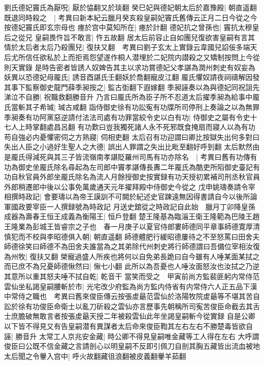 劉氏德妃竇氏為厭呪|{
	厭於恊翻又於琰翻}
癸巳妃與德妃朝太后於嘉豫殿|{
	朝直遥翻}
既退同時殺之　|{
	考異曰新本紀云臘月癸亥殺皇嗣妃竇氏舊傳云正月二日今從之今按德妃竇氏即玄宗母也}
瘞於宫中莫知所在|{
	瘞於計翻}
德妃抗之曾孫也|{
	竇抗太穆皇后之從兄}
皇嗣畏忤旨不敢言|{
	忤五故翻}
居太后前容止自如團兒復欲害皇嗣有言其情於太后者太后乃殺團兒|{
	復扶又翻　考異曰劉子玄太上實錄云韋國兒諂佞多端天后尤所信任欲私於上而拒焉怨望遂作桐人潜埋於二妃院内譛殺之又矯制按問上今從則天實錄}
是時告密者皆誘人奴婢告其主以求功賞德妃父孝諶為潤州刺史有奴妄為妖異以恐德妃母龎氏|{
	誘音酉諶氏壬翻妖於喬翻寵皮江翻}
龎氏懼奴請夜祠禱解因發其事下監察御史龍門薛季昶按之|{
	監古衘翻下遐嫁翻}
季昶誣奏以為與德妃同祝詛先涕泣不自勝|{
	祝職救翻勝音升}
乃言曰龎氏所為臣子所不忍道太后擢季昶為給事中龎氏當斬其子希瑊|{
	瑊古咸翻}
詣侍御史徐有功訟寃有功牒所司停刑上奏論之以為無罪季昶奏有功阿黨惡逆請付法法司處有功罪當絞令史以白有功|{
	侍御史之屬有令史十七人上時掌翻處昌呂翻}
有功歎曰豈我獨死諸人永不死邪既食掩扇而寢人以為有功苟自強必内憂懼密伺之方熟寢|{
	伺相吏翻}
太后召有功迎謂曰卿比按獄失出何多對曰失出人臣之小過好生聖人之大德|{
	誤出人罪謂之失出比毗至翻好呼到翻}
太后默然由是龎氏得減死與其三子皆流嶺南孝諶貶羅州司馬有功亦除名　|{
	考異曰舊有功傳有功為御史坐龎氏除名尋起為左司郎中竇孝諶傳長夀二年龎氏為酷吏所䧟御史臺記有功自秋官員外郎坐龎氏除名為流人月餘授御史按實録有功天授初累補司刑丞秋官員外郎稍遷郎中後以公事免萬歲通天元年擢拜殿中侍御史今從之}
戊申姚璹奏請令宰相撰時政記|{
	會要璹以為帝王謨訓不可闕於紀述史官踈遠無因得書請自今以後所論軍國政要宰臣一人撰録號為時政記}
月送史舘從之時政記自此始　臘月丁卯降皇孫成器為壽春王恒王成義為衡陽王|{
	恒戶登翻}
楚王隆基為臨淄王衛王隆範為巴陵王趙王隆業為彭城王皆睿宗之子也　春一月庚子以夏官侍郎婁師德同平章事師德寛厚清慎犯而不校與李昭德俱入朝|{
	朝直遥翻}
師德體肥行緩昭德屢待之不至怒罵曰田舍夫師德徐笑曰師德不為田舍夫誰當為之其弟除代州刺史將行師德謂曰吾備位宰相汝復為州牧|{
	復扶又翻}
榮寵過盛人所疾也將何以自免弟長跪曰自今雖有人唾某面某拭之而已庶不為兄憂師德愀然曰|{
	愀七小翻}
此所以為吾憂也人唾汝面怒汝也汝拭之乃逆其意所以重其怒夫唾不拭自乾|{
	乾音干}
當笑而受之　甲寅前尚方監裴匪躬内常侍范雲仙坐私謁皇嗣腰斬於市|{
	光宅改少府監為尚方監内侍省有内常侍六人正五品下漢中常侍之職也　考異曰舊來俊臣傳云按張䖍朂范雲仙於洛陽牧院䖍朂等不堪其苦自訟於徐有功俊臣命衛士以亂刀斫殺之雲仙亦言歷事先朝稱所司寃苦俊臣命截去其舌士庶膽破無敢言者按張䖍朂天授二年被殺雲仙此年坐謁皇嗣斬今從實録}
自是公卿以下皆不得見又有告皇嗣潜有異謀者太后命來俊臣鞫其左右左右不勝楚毒皆欲自誣|{
	勝音升}
太常工人京兆安金藏|{
	時公卿不得見皇嗣唯金藏等工人得在左右}
大呼謂俊臣曰公既不信金藏之言請剖心以明皇嗣不反即引佩刀自剖其胸五藏皆出流血被地太后聞之令轝入宫中|{
	呼火故翻藏徂浪翻被皮義翻轝羊茹翻}
